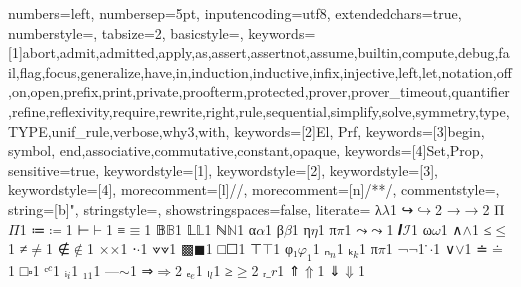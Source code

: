 {
  numbers=left,
  numbersep=5pt,
  inputencoding=utf8,
  extendedchars=true,
  numberstyle=\footnotesize,
  tabsize=2,
  basicstyle={\ttfamily\scriptsize\upshape},
  keywords=[1]{abort,admit,admitted,apply,as,assert,assertnot,assume,builtin,compute,debug,fail,flag,focus,generalize,have,in,induction,inductive,infix,injective,left,let,notation,off,on,open,prefix,print,private,proofterm,protected,prover,prover_timeout,quantifier,refine,reflexivity,require,rewrite,right,rule,sequential,simplify,solve,symmetry,type,TYPE,unif_rule,verbose,why3,with},
  keywords=[2]{El, Prf},
  keywords=[3]{begin, symbol, end,associative,commutative,constant,opaque},
  keywords=[4]{Set,Prop},
  sensitive=true,
  keywordstyle={[1]\bfseries\color{purple}},
  keywordstyle={[2]\bfseries\color{purple}},
  keywordstyle={[3]\bfseries\color{violet}},
  keywordstyle={[4]\bfseries\color{blue}},
  morecomment=[l]{//},
  morecomment=[n]{/*}{*/},
  commentstyle={\itshape\color{teal}},
  string=[b]{"},
  stringstyle=\color{orange},
  showstringspaces=false,
  literate=
  {λ}{$\lambda$}1
  {↪}{$\hookrightarrow$}2
  {→}{$\rightarrow$}2
  {Π}{$\Pi$}1
  {≔}{$\coloneqq$}1
  {⊢}{$\vdash$}1
  {≡}{$\equiv$}1
  {𝔹}{$\mathbb{B}$}1
  {𝕃}{$\mathbb{L}$}1
  {ℕ}{$\mathbb{N}$}1
  {α}{$\alpha$}1
  {β}{$\beta$}1
  {η}{$\eta$}1
  {π}{$\pi$}1
  {⤳}{$\rightcurvedarrow$}1
  {𝑰}{$\mathcal{I}$}1
  {ω}{$\omega$}1
  {∧}{$\wedge$}1
  {≤}{$\le$}1
  {≠}{$\neq$}1
  {∉}{$\notin$}1
  {×}{$\times$}1
  {⋅}{$\cdot$}1
  {⟇}{$\veedot$}1
  {▩}{$\blacksquare$}1
  {□}{$\Square$}1
  {⊤}{$\top$}1
  {φ₁}{$\varphi_1$}1
  {ₙ}{$_n$}1
  {ₖ}{$_k$}1
  {π}{$\pi$}1
  {¬}{$\neg$}1
  { ̇}{$\cdot$}1
  {∨}{$\lor$}1
  {≐}{$\doteq$}1
  {□}{$\square$}1
  {ᶜ}{${^c}$}1
  {ᵢ}{${_i}$}1
  {₁}{${_1}$}1
  {—}{$\sim$}1
  {⇒}{$\Rightarrow$}2
  {ₑ}{${_e}$}1
  {ₗ}{${_l}$}1
  {≥}{$\geq$}2
  {ᵣ}{$\_r$}1
  {⇑}{$\Uparrow$}1
  {⇓}{$\Downarrow$}1
}
